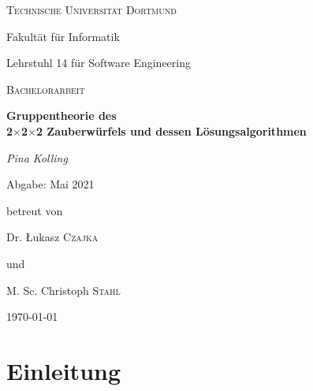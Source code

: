 \documentclass[12pt,a4paper, usenames, dvipsnames]{article}
\theoremstyle{mystyle}
\theoremstyle{definition}
\begin{document}


\begin{titlepage}
	\centering
	{\scshape\LARGE Technische Universität Dortmund \par}
	Fakultät für Informatik \par
	Lehrstuhl 14 für Software Engineering \par
	\vspace{1cm}
	{\scshape\Large Bachelorarbeit \par }
	\vspace{1.5cm}
	{\huge\bfseries  Gruppentheorie des \\ 2$\times$2$\times$2 Zauberwürfels und dessen Lösungsalgorithmen \par}
	\vspace{2cm}
	{\Large\itshape Pina Kolling\par}
	\vspace{0.5cm}
	{Abgabe: Mai 2021 \par }
	\vfill
	betreut von\par
	Dr. \L ukasz \textsc{Czajka} \par 
	und \par 
	M. Sc. Christoph \textsc{Stahl} 

	\vfill

	{\large \today\par}
\end{titlepage}

\setcounter{page}{1}


\begin{spacing}{0.8}

\tableofcontents

\end{spacing}






\newpage


\setcounter{page}{1} 
%

%
%
%
%
%
%
%
%
%
\section{Einleitung}

\label{Kapitel_Einleitung}
\end{document}

